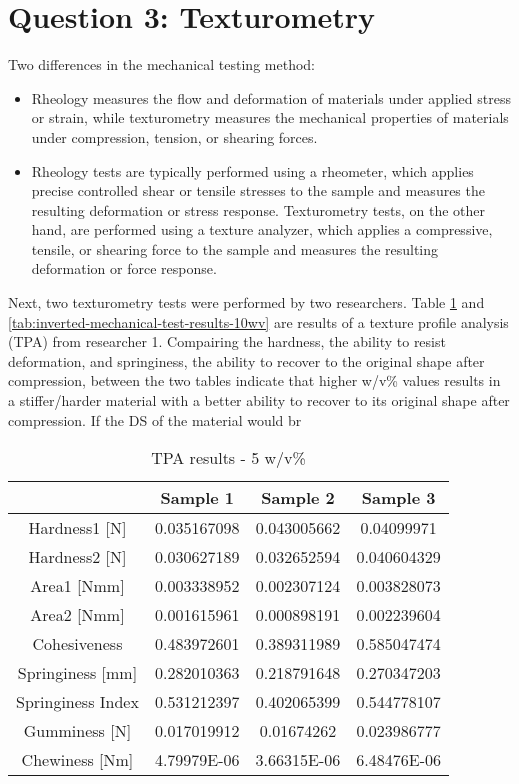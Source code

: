 \section{Question 3: Texturometry}

Two differences in the mechanical testing method:
\begin{itemize}
    \item[1.] Rheology measures the flow and deformation of materials under applied stress or strain, while texturometry 
    measures the mechanical properties of materials under compression, tension, or shearing forces.
    \item[2.] Rheology tests are typically performed using a rheometer, which applies precise controlled shear or tensile 
    stresses to the sample and measures the resulting deformation or stress response. Texturometry tests, on the other 
    hand, are performed using a texture analyzer, which applies a compressive, tensile, or shearing force to the sample and measures the resulting deformation or force response.
\end{itemize}

Next, two texturometry tests were performed by two researchers. Table \ref{tab:inverted-mechanical-test-results} and \ref{tab:inverted-mechanical-test-results-10wv} are results of a texture profile analysis (TPA) from researcher 1. 
Compairing the hardness, the ability to resist deformation, and springiness, the ability to recover to the original shape after compression, between the two tables indicate that higher w/v\% values results in a stiffer/harder material with a better ability to recover to its original shape after compression. 
If the DS of the material would br  

\begin{table}[H]
    \centering
    \begin{tabular}{c|ccc}
    \hline
    & Sample 1 & Sample 2 & Sample 3 \\ \hline
    Hardness1 [N] & 0.035167098 & 0.043005662 & 0.04099971 \\ 
    Hardness2 [N] & 0.030627189 & 0.032652594 & 0.040604329 \\ 
    Area1 [Nmm] & 0.003338952 & 0.002307124 & 0.003828073 \\ 
    Area2 [Nmm] & 0.001615961 & 0.000898191 & 0.002239604 \\ 
    Cohesiveness & 0.483972601 & 0.389311989 & 0.585047474 \\ 
    Springiness [mm] & 0.282010363 & 0.218791648 & 0.270347203 \\ 
    Springiness Index & 0.531212397 & 0.402065399 & 0.544778107 \\ 
    Gumminess [N] & 0.017019912 & 0.01674262 & 0.023986777 \\ 
    Chewiness [Nm] & 4.79979E-06 & 3.66315E-06 & 6.48476E-06 \\
    \end{tabular}
    \caption{TPA results - 5 w/v\%}
    \label{tab:inverted-mechanical-test-results}
\end{table}

